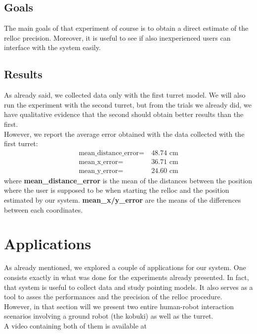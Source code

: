 \subsection{Goals}
The main goals of that experiment of course is to obtain a direct estimate of the relloc precision. Moreover, it is useful to see if also inexperienced users can interface with the system easily.

\subsection{Results}
As already said, we collected data only with the first turret model. We will also run the experiment with the second turret, but from the trials we already did, we have qualitative evidence that the second should obtain better results than the first. \\
However, we report the average error obtained with the data collected with the first turret:
\begin{align}
    \text{mean\_distance\_error} =&\ 48.74\text{ cm} \nonumber\\
    \text{mean\_x\_error} =&\ 36.71\text{ cm}\nonumber\\
    \text{mean\_y\_error} =&\ 24.60\text{ cm}\nonumber
\end{align}
where \textbf{mean\_distance\_error} is the mean of the distances between the position where the user is supposed to be when starting the relloc and the position estimated by our system. \textbf{mean\_x/y\_error} are the means of the differences between each coordinates.

\section{Applications}
As already mentioned, we explored a couple of applications for our system. One consists exactly in what was done for the experiments already presented. In fact, that system is useful to collect data and study pointing models. It also serves as a tool to asses the performances and the precision of the relloc procedure.\\
However, in that section will we present two entire human-robot interaction scenarios involving a ground robot (the kobuki) as well as the turret.\\
A video containing both of them is available at 

